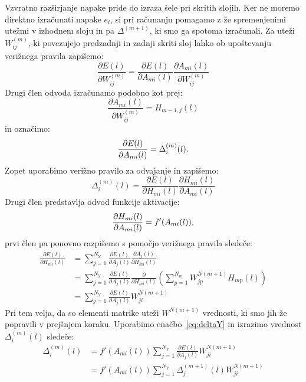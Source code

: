 \documentclass[mat1]{fmfdelo}
\begin{document}
Vzvratno razširjanje napake pride do izraza šele pri skritih slojih. Ker ne moremo direktno izračunati napake $e_i$, si pri računanju pomagamo z že spremenjenimi utežmi v izhodnem sloju in pa $\Delta^{(m+1)}$, ki smo ga spotoma izračunali. Za uteži $W^{(m)}_{ij}$, ki povezujejo predzadnji in zadnji skriti sloj lahko ob upoštevanju verižnega pravila zapišemo:
%
\begin{equation*}
 \frac{\partial E(l)}{\partial W^{(m)}_{ij}} = \frac{\partial E(l)}{\partial A_{mi}(l)} \frac{\partial A_{mi}(l)}{\partial W^{(m)}_{ij}}
\end{equation*}
%
Drugi člen odvoda izračunamo podobno kot prej:
\begin{equation*}
\frac{\partial A_{mi}(l)}{\partial W^{(m)}_{ij}} = H_{m-1,j}(l)
\end{equation*}
%
in označimo:
%
\begin{equation*}
\frac{\partial E(l)}{\partial A_{mi}(l)} = \Delta^{(m)}_i(l) \text.
\end{equation*}
%
Zopet uporabimo verižno pravilo za odvajanje in zapišemo:
%
\begin{equation*}
\Delta^{(m)}_i(l) = \frac{\partial E(l)}{\partial H_{mi}(l)}\frac{\partial H_{mi}(l)}{\partial A_{mi}(l)}
\end{equation*}
%
Drugi člen predstavlja odvod funkcije aktivacije:
%
\begin{equation*}
\frac{\partial H_{mi}(l)}{\partial A_{mi}(l)} =  f'(A_{mi}(l)) \text,
\end{equation*}
%
prvi člen pa ponovno razpišemo s pomočjo verižnega pravila sledeče:
%
\begin{equation*}
\begin{aligned}
\frac{\partial E(l)}{\partial H_{mi}(l)} &=  \sum^{N_Y}_{j=1} \frac{\partial E(l)}{\partial A_j(l)}\frac{\partial A_j(l)}{\partial H_{mi}(l)}  \\
& =   \sum^{N_Y}_{j=1} \frac{\partial E(l)}{\partial A_j(l)}\frac{\partial}{\partial H_{mi}(l)} \left(\sum^{N_m}_{p=1} W^{N (m+1)}_{jp}H_{mp}(l)\right)\\
&= \sum^{N_Y}_{j=1} \frac{\partial E(l)}{\partial A_j(l)} W^{N (m+1)}_{ji}
\end{aligned}
\end{equation*}
%
Pri tem velja, da so elementi matrike uteži $W^{N(m+1)}$ vrednosti, ki smo jih že popravili v prejšnjem koraku. Uporabimo enačbo~\eqref{eq:deltaY} in izrazimo vrednost $\Delta^{(m)}_i(l)$ sledeče:
%
\begin{equation*}
\begin{aligned}
\Delta^{(m)}_i(l) &= f'(A_{mi}(l))  \sum^{N_Y}_{j=1} \frac{\partial E(l)}{\partial A_j(l)} W^{N (m+1)}_{ji} \\
&= f'(A_{mi}(l))  \sum^{N_Y}_{j=1} \Delta ^{(m+1)}_j(l)W^{N (m+1)}_{ji}
\end{aligned}
\end{equation*}
\end{document}
